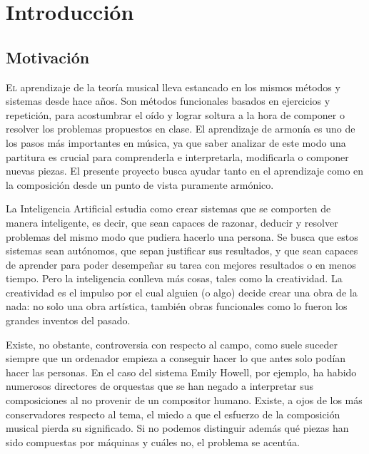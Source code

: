 \chapter{Introducción}
\label{chap:introduccion}


\section{Motivación}
 \label{sec:motivation}
  \lettrine{E}l aprendizaje de la teoría musical lleva estancado en los mismos métodos y sistemas desde hace años. Son métodos funcionales basados en ejercicios y repetición, para acostumbrar el oído y lograr soltura a la hora de componer o resolver los problemas propuestos en clase. El aprendizaje de armonía es uno de los pasos más importantes en música, ya que saber analizar de este modo una partitura es crucial para comprenderla e interpretarla, modificarla o componer nuevas piezas. El presente proyecto busca ayudar tanto en el aprendizaje como en la composición desde un punto de vista puramente armónico. 
 
 La Inteligencia Artificial estudia como crear sistemas que se comporten de manera inteligente, es decir, que sean capaces de razonar, deducir y resolver problemas del mismo modo que pudiera hacerlo una persona. Se busca que estos sistemas sean autónomos, que sepan justificar sus resultados, y que sean capaces de aprender para poder desempeñar su tarea con mejores resultados o en menos tiempo. Pero la inteligencia conlleva más cosas, tales como la creatividad. La creatividad es el impulso por el cual alguien (o algo) decide crear una obra de la nada: no solo una obra artística, también obras funcionales como lo fueron los grandes inventos del pasado. 
 
 Existe, no obstante, controversia con respecto al campo, como suele suceder siempre que un ordenador empieza a conseguir hacer lo que antes solo podían hacer las personas. En el caso del sistema Emily Howell\cite{experiments-musical-intelligence}, por ejemplo, ha habido numerosos directores de orquestas que se han negado a interpretar sus composiciones al no provenir de un compositor humano. Existe, a ojos de los más conservadores respecto al tema, el miedo a que el esfuerzo de la composición musical pierda su significado. Si no podemos distinguir además qué piezas han sido compuestas por máquinas y cuáles no, el problema se acentúa. 
 
